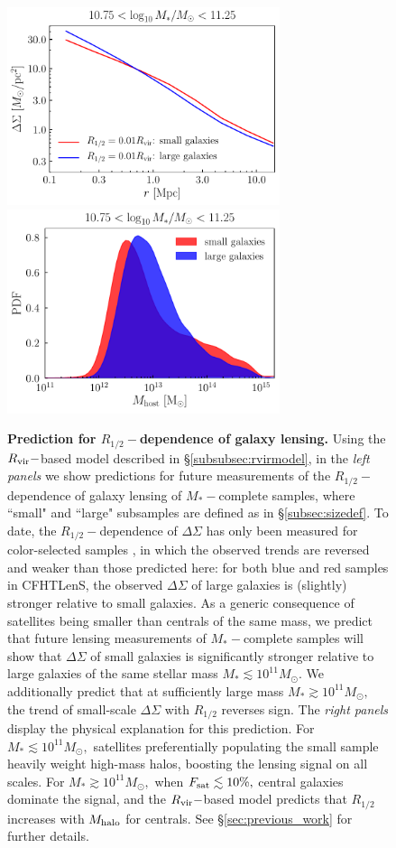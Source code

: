 \documentclass[usenatbib,usegraphicx,letterpaper]{mn2e}
\newcommand{\rhalf}{R_{1/2}}
\newcommand{\mstar}{M_{\ast}}
\newcommand{\mhalo}{M_{\rm halo}}
\newcommand{\rvir}{R_{\rm vir}}
\newcommand{\msun}{M_\odot}
\begin{document}
\begin{figure}
\includegraphics[width=8cm]{FIGS/rvir_only_lensing_prediction3.pdf}
\includegraphics[width=8cm]{FIGS/host_mass_distributions_sm10p75_sm11p25.pdf}
\caption{
{\bf Prediction for $\rhalf-$dependence of galaxy lensing.}
Using the $\rvir-$based model described in \S\ref{subsubsec:rvirmodel}, in the {\em left panels} we show predictions for future measurements of the $\rhalf-$dependence of galaxy lensing of $\mstar-$complete samples, where ``small" and ``large" subsamples are defined as in \S\ref{subsec:sizedef}. To date, the $\rhalf-$dependence of $\Delta\Sigma$ has only been measured for color-selected samples \citep{charlton_etal17}, in which the observed trends are reversed and weaker than those predicted here: for both blue and red samples in CFHTLenS, the observed $\Delta\Sigma$ of large galaxies is (slightly) stronger relative to small galaxies. As a generic consequence of satellites being smaller than centrals of the same mass, we predict that future lensing measurements of $\mstar-$complete samples will show that $\Delta\Sigma$ of small galaxies is significantly stronger relative to large galaxies of the same stellar mass $\mstar\lesssim10^{11}\msun.$ We additionally predict that at sufficiently large mass $\mstar\gtrsim10^{11}\msun,$ the trend of small-scale $\Delta\Sigma$ with $\rhalf$ reverses sign. The {\em right panels} display the physical explanation for this prediction. For $\mstar\lesssim10^{11}\msun,$ satellites preferentially populating the small sample heavily weight high-mass halos, boosting the lensing signal on all scales. For $\mstar\gtrsim10^{11}\msun,$ when $F_{\rm sat}\lesssim10\%,$ central galaxies dominate the signal, and the $\rvir-$based model predicts that $\rhalf$ increases with $\mhalo$ for centrals. See \S\ref{sec:previous_work} for further details. 
}
\label{fig:lensingprediction}
\end{figure}
\end{document}
